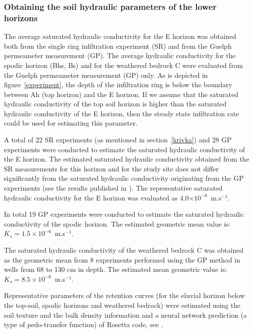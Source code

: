 \documentclass[review]{myarticle}
\begin{document}
\subsubsection{Obtaining the soil hydraulic parameters of the lower horizons}%
\label{dolni}


The average saturated hydraulic conductivity for the E horizon was obtained both from the single ring infiltration experiment (SR) and from the Guelph permeameter measurement (GP). The average hydraulic conductivity for the spodic horizon (Bhs, Bs) and for the weathered bedrock C were evaluated from the Guelph permeameter measurement (GP) only.
As is depicted in figure~\ref{experiment}, the depth of the infiltration ring is below the boundary between Ah (top horizon) and the E horizon. If we assume that the saturated hydraulic conductivity of the top soil horizon is higher than the saturated hydraulic conductivity of the E horizon, then the steady state infiltration rate could be used for estimating this parameter.



A total of 22 SR experiments (as mentioned in section~\ref{krivka}) and 28 GP experiments were conducted to estimate the saturated hydraulic conductivity of the E horizon. The estimated saturated hydraulic conductivity obtained from the SR measurements for this horizon and for the study site does not differ significantly from the saturated hydraulic conductivity originating from the GP experiments (see the results published in \citep{Jacka1}).
 The representative saturated hydraulic conductivity for the E horizon was evaluated as 4.0$\times 10^{-6}$~m.s$^{-1}$.


In total 19 GP experiments were conducted to estimate the saturated hydraulic conductivity of the spodic horizon. The estimated geometric mean value is: $K_s =  1.5\times 10^{-6}$~m.s$^{-1}$.

The saturated hydraulic conductivity of the weathered
    bedrock C was obtained as the geometric mean  from 8 experiments performed using the GP method  in wells from 68 to 130 cm in depth. The estimated mean geometric value is: $K_s =  8.5\times 10^{-6}$~m.s$^{-1}$.

Representative parameters of the retention curves (for the eluvial horizon below the top-soil, spodic horizons and weathered bedrock) were estimated using the soil texture and the bulk density information and a neural network prediction (a type of pedo-transfer function) of Rosetta code, see \citep{Schaap}. 
\end{document}
